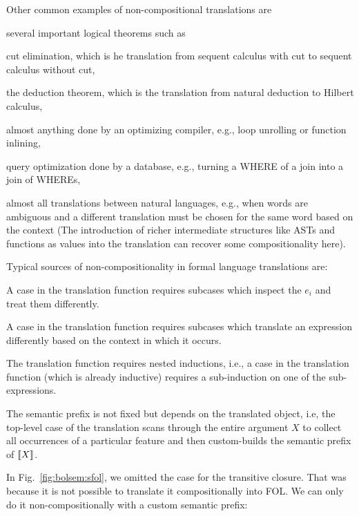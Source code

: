 Other common examples of non-compositional translations are
\begin{compactitem}
 \item several important logical theorems such as
  \begin{compactitem}
   \item cut elimination, which is he translation from sequent calculus with cut to sequent calculus without cut,
   \item the deduction theorem, which is the translation from natural deduction to Hilbert calculus,
  \end{compactitem}
 \item almost anything done by an optimizing compiler, e.g., loop unrolling or function inlining,
 \item query optimization done by a database, e.g., turning a WHERE of a join into a join of WHEREs,
 \item almost all translations between natural languages, e.g., when words are ambiguous and a different translation must be chosen for the same word based on the context (The introduction of richer intermediate structures like ASTs and functions as values into the translation can recover some compositionality here).
\end{compactitem}

Typical sources of non-compositionality in formal language translations are:
\begin{compactitem}
 \item A case in the translation function requires subcases which inspect the $e_i$ and treat them differently.
 \item A case in the translation function requires subcases which translate an expression differently based on the context in which it occurs.
 \item The translation function requires nested inductions, i.e., a case in the translation function (which is already inductive) requires a sub-induction on one of the sub-expressions.
 \item The semantic prefix is not fixed but depends on the translated object, i.e, the top-level case of the translation scans through the entire argument $X$ to collect all occurrences of a particular feature and then custom-builds the semantic prefix of $\llbracket X\rrbracket$.
\end{compactitem}

In Fig.~\ref{fig:bolsem:sfol}, we omitted the case for the transitive closure.
That was because it is not possible to translate it compositionally into FOL.
We can only do it non-compositionally with a custom semantic prefix:


